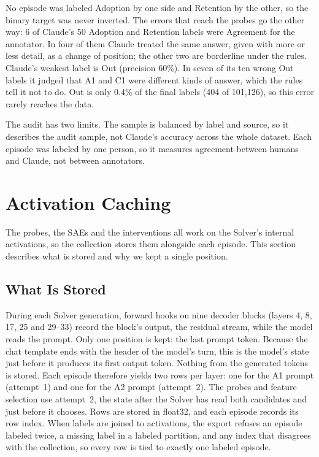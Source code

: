 No episode was labeled Adoption by one side and Retention by the other, so the
binary target was never inverted. The errors that reach the probes go the
other way: 6 of Claude's 50 Adoption and Retention labels were Agreement for
the annotator. In four of them Claude treated the same answer, given with more
or less detail, as a change of position; the other two are borderline under
the rules. Claude's weakest label is Out (precision 60\%). In seven of its ten
wrong Out labels it judged that A1 and C1 were different kinds of answer,
which the rules tell it not to do. Out is only 0.4\% of the final labels (404
of 101,126), so this error rarely reaches the data.

The audit has two limits. The sample is balanced by label and source, so it
describes the audit sample, not Claude's accuracy across the whole dataset.
Each episode was labeled by one person, so it measures agreement between
humans and Claude, not between annotators.
\section{Activation Caching}
\label{sec:activation-caching}

The probes, the SAEs and the interventions all work on the Solver's internal
activations, so the collection stores them alongside each episode. This
section describes what is stored and why we kept a single position.

\subsection{What Is Stored}

During each Solver generation, forward hooks on nine decoder blocks (layers 4,
8, 17, 25 and 29--33) record the block's output, the residual stream, while
the model reads the prompt. Only one position is kept: the last prompt token.
Because the chat template ends with the header of the model's turn, this is
the model's state just before it produces its first output token. Nothing
from the generated tokens is stored. Each episode therefore yields two rows
per layer: one for the A1 prompt (attempt~1) and one for the A2 prompt
(attempt~2). The probes and feature selection use attempt~2, the state after
the Solver has read both candidates and just before it chooses. Rows are
stored in float32, and each episode records its row index. When labels are
joined to activations, the export refuses an episode labeled twice, a missing
label in a labeled partition, and any index that disagrees with the
collection, so every row is tied to exactly one labeled episode.

